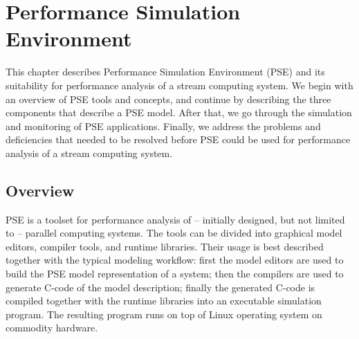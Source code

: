 \chapter{Performance Simulation Environment}
\label{chapter:pse}


This chapter describes Performance Simulation Environment (PSE) and its suitability for performance analysis of a stream computing system. We begin with an overview of PSE tools and concepts, and continue by describing the three components that describe a PSE model. After that, we go through the simulation and monitoring of PSE applications. Finally, we address the problems and deficiencies that needed to be resolved before PSE could be used for performance analysis of a stream computing system.

\section{Overview}




PSE is a toolset for performance analysis of -- initially designed, but not limited to -- parallel computing systems. The tools can be divided into graphical model editors, compiler tools, and runtime libraries. Their usage is best described together with the typical modeling workflow: first the model editors are used to build the PSE model representation of a system; then the compilers are used to generate C-code of the model description; finally the generated C-code is compiled together with the runtime libraries into an executable simulation program. The resulting program runs on top of Linux operating system on commodity hardware.

